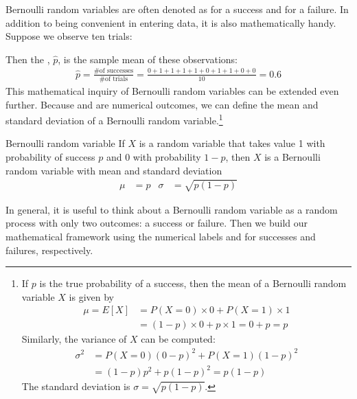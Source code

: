 Bernoulli random variables are often denoted as 
for a success and  for a failure.
In addition to being convenient in entering data,
it is also mathematically handy.
Suppose we observe ten trials:
\begin{center}
         
\end{center}
Then the , $\hat{p}$, is the
sample mean of these observations:
\begin{eqnarray*}
\hat{p} = \frac{\text{\# of successes}}{\text{\# of trials}}
    = \frac{0+1+1+1+1+0+1+1+0+0}{10} = 0.6
\end{eqnarray*}%
This mathematical inquiry of Bernoulli random variables can
be extended even further.
Because  and  are numerical outcomes,
we can define the {mean} and {standard deviation}
of a Bernoulli random variable.\footnote{If ${p}$ is the true probability of a success, then the mean of a Bernoulli random variable $X$ is given by
\begin{align*}
\mu = E[X] &= P(X = 0) \times 0 + P(X = 1) \times 1 \\
	&= (1 - p) \times 0 + p\times 1 = 0 + p = p
\end{align*}
Similarly, the variance of $X$ can be computed:
\begin{align*}
\sigma^2 &= {P(X=0)(0-p)^2 + P(X=1)(1-p)^2} \\
	&= {(1-p)p^2 + p(1-p)^2} = {p(1-p)}
\end{align*}
The standard deviation is $\sigma=\sqrt{p(1-p)}$.}

\begin{onebox}{Bernoulli random variable}
  If $X$ is a random variable that takes value 1 with
  probability of success $p$ and 0 with probability $1-p$,
  then $X$ is a Bernoulli random variable with mean
  and standard deviation
  \begin{align*}
  \mu &= p
      &\sigma&= \sqrt{p(1-p)}
  \end{align*}
\end{onebox}

In general, it is useful to think about a Bernoulli random variable as a random process with only two outcomes: a success or failure. Then we build our mathematical framework using the numerical labels  and  for successes and failures, respectively.

